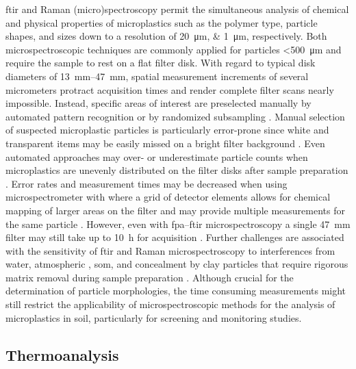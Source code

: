 \ac{ftir} and Raman (micro)spectroscopy permit the simultaneous analysis of chemical and physical properties of microplastics such as the polymer type, particle shapes, and sizes down to a resolution of \SIlist{20;1}{\micro\meter},
respectively. Both microspectroscopic techniques are commonly applied for particles \SI{<500}{\micro\meter} and require the sample to rest on a flat filter disk. With regard to typical disk diameters of \SIrange{13}{47}{\milli\meter}, spatial measurement increments of several micrometers protract acquisition times and render complete filter scans nearly impossible. Instead, specific areas of interest are preselected manually by automated pattern recognition or by randomized subsampling \citep{AngerRaman2018,XuFTIR2019}. Manual selection of suspected microplastic particles is particularly error-prone since white and transparent items may be easily missed on a bright filter background \citep{LaresIntercomparison2019}. Even automated approaches may over-
or underestimate particle counts when microplastics are unevenly distributed on the filter disks after sample preparation \citep{AngerRaman2018}. Error rates and measurement times may be decreased when using  microspectrometer with  where a grid of detector elements allows for chemical mapping of larger areas on the filter and may provide multiple measurements for the same particle \citep{SimonQuantification2018}. However, even with \ac{fpa}--\ac{ftir} microspectroscopy a single \SI{47}{\milli\meter} filter may still take up to \SI{10}{\hour} for acquisition \citep{MintenigIdentification2017}. Further challenges are associated with the sensitivity of \ac{ftir} and Raman microspectroscopy to interferences from water, atmospheric , \ac{som}, and concealment by clay particles that require rigorous matrix removal during sample preparation \citep{AngerRaman2018,XuFTIR2019}. Although crucial for the determination of particle morphologies, the time consuming measurements might still restrict the applicability of microspectroscopic methods for the analysis of microplastics in soil, particularly for screening and monitoring studies.

\subsection{Thermoanalysis}
\label{sec:analytical-techniques:thermoanalysis}

